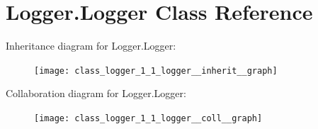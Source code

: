 \hypertarget{class_logger_1_1_logger}{\section{Logger.\-Logger Class Reference}
\label{class_logger_1_1_logger}
}


Inheritance diagram for Logger.\-Logger\-:
\nopagebreak
\begin{figure}[H]
\begin{center}
\leavevmode
\texttt{[image: class\_logger\_1\_1\_logger\_\_inherit\_\_graph]}
\end{center}
\end{figure}


Collaboration diagram for Logger.\-Logger\-:
\nopagebreak
\begin{figure}[H]
\begin{center}
\leavevmode
\texttt{[image: class\_logger\_1\_1\_logger\_\_coll\_\_graph]}
\end{center}
\end{figure}

